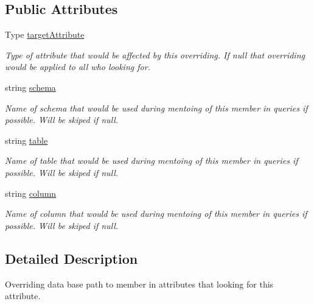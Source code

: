 \subsection*{Public Attributes}
\begin{DoxyCompactItemize}
\item 
Type \mbox{\hyperlink{class_uniform_data_operator_1_1_sql_1_1_attributes_1_1_modifiers_1_1_d_b_path_override_adab73111e55f6fe699e34e19a1b86335}{target\+Attribute}}
\begin{DoxyCompactList}\small\item\em Type of attribute that would be affected by this overriding. If null that overriding would be applied to all who looking for. \end{DoxyCompactList}\item 
string \mbox{\hyperlink{class_uniform_data_operator_1_1_sql_1_1_attributes_1_1_modifiers_1_1_d_b_path_override_ac9dae1ac46998a11f6b037dc72639e53}{schema}}
\begin{DoxyCompactList}\small\item\em Name of schema that would be used during mentoing of this member in queries if possible. Will be skiped if null. \end{DoxyCompactList}\item 
string \mbox{\hyperlink{class_uniform_data_operator_1_1_sql_1_1_attributes_1_1_modifiers_1_1_d_b_path_override_abc320e5e035c21997a54aad8e4df52b7}{table}}
\begin{DoxyCompactList}\small\item\em Name of table that would be used during mentoing of this member in queries if possible. Will be skiped if null. \end{DoxyCompactList}\item 
string \mbox{\hyperlink{class_uniform_data_operator_1_1_sql_1_1_attributes_1_1_modifiers_1_1_d_b_path_override_afb1db0b618dd444cdaaab366172e4af1}{column}}
\begin{DoxyCompactList}\small\item\em Name of column that would be used during mentoing of this member in queries if possible. Will be skiped if null. \end{DoxyCompactList}\end{DoxyCompactItemize}


\subsection{Detailed Description}
Overriding data base path to member in attributes that looking for this attribute. 




